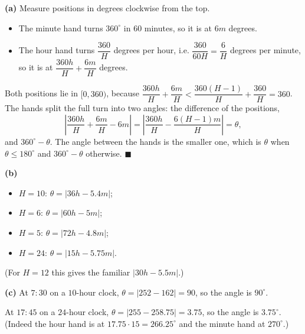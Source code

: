 \textbf{(a)} Measure positions in degrees clockwise from the top.
\begin{itemize}
\item The minute hand turns $360^\circ$ in $60$ minutes, so it is at $6m$ degrees.
\item The hour hand turns $\dfrac{360}{H}$ degrees per hour, i.e. $\dfrac{360}{60H}=\dfrac6H$ degrees per minute, so it is at $\dfrac{360h}{H}+\dfrac{6m}{H}$ degrees.
\end{itemize}
Both positions lie in $[0,360)$, because $\dfrac{360h}H+\dfrac{6m}H<\dfrac{360(H-1)}H+\dfrac{360}H=360$. The hands split the full turn into two angles: the difference of the positions,
\[\left|\dfrac{360h}{H}+\dfrac{6m}{H}-6m\right|=\left|\dfrac{360h}{H}-\dfrac{6(H-1)m}{H}\right|=\theta,\]
and $360^\circ-\theta$. The angle between the hands is the smaller one, which is $\theta$ when $\theta\le180^\circ$ and $360^\circ-\theta$ otherwise. $\blacksquare$

\textbf{(b)}
\begin{itemize}
\item $H=10$: $\theta=|36h-5.4m|$;
\item $H=6$: $\theta=|60h-5m|$;
\item $H=5$: $\theta=|72h-4.8m|$;
\item $H=24$: $\theta=|15h-5.75m|$.
\end{itemize}
(For $H=12$ this gives the familiar $|30h-5.5m|$.)

\textbf{(c)} At $7{:}30$ on a $10$-hour clock, $\theta=|252-162|=90$, so the angle is $\boxed{90^\circ}$.

At $17{:}45$ on a $24$-hour clock, $\theta=|255-258.75|=3.75$, so the angle is $\boxed{3.75^\circ}$. (Indeed the hour hand is at $17.75\cdot15=266.25^\circ$ and the minute hand at $270^\circ$.)

